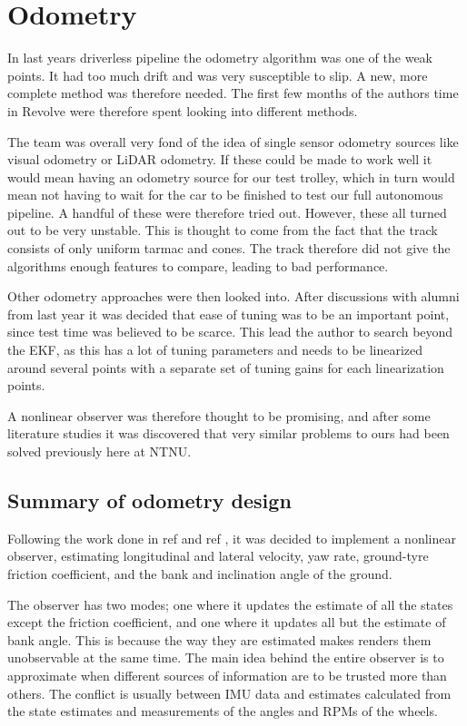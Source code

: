 \section{Odometry}

In last years driverless pipeline the odometry algorithm was one of the weak points. It had too much drift and was very susceptible to slip. A new, more complete method was therefore needed. The first few months of the authors time in Revolve were therefore spent looking into different methods.

The team was overall very fond of the idea of single sensor odometry sources like visual odometry or LiDAR odometry. If these could be made to work well it would mean having an odometry source for our test trolley, which in turn would mean not having to wait for the car to be finished to test our full autonomous pipeline. A handful of these were therefore tried out. However, these all turned out to be very unstable. This is thought to come from the fact that the track consists of only uniform tarmac and cones. The track therefore did not give the algorithms enough features to compare, leading to bad performance.

Other odometry approaches were then looked into. After discussions with alumni from last year it was decided that ease of tuning was to be an important point, since test time was believed to be scarce. This lead the author to search beyond the EKF, as this has a lot of tuning parameters and needs to be linearized around several points with a separate set of tuning gains for each linearization points. 

A nonlinear observer was therefore thought to be promising, and after some literature studies it was discovered that very similar problems to ours had been solved previously here at NTNU. 

\subsection{Summary of odometry design}

Following the work done in ref \cite{Automatica08} and ref \cite{MainStateEst}, it was decided to implement a nonlinear observer, estimating longitudinal and lateral velocity, yaw rate, ground-tyre friction coefficient, and the bank and inclination angle of the ground.

The observer has two modes; one where it updates the estimate of all the states except the friction coefficient, and one where it updates all but the estimate of bank angle. This is because the way they are estimated makes renders them unobservable at the same time. 
The main idea behind the entire observer is to approximate when different sources of information are to be trusted more than others. The conflict is usually between \gls{IMU} data and estimates calculated from the state estimates and measurements of the angles and \glspl{RPM} of the wheels.

